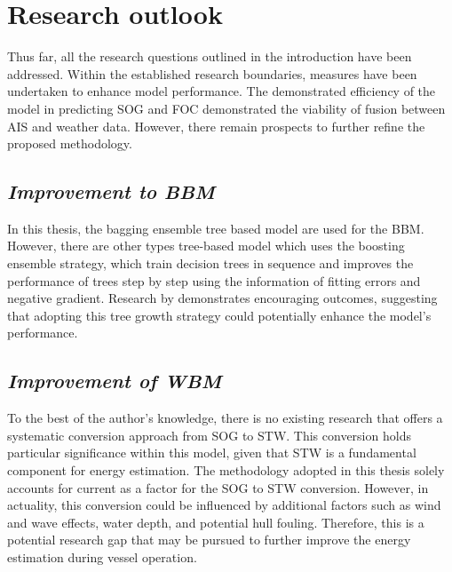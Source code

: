 \pagebreak

\section{Research outlook}\label{sec:research_outlook}

Thus far, all the research questions outlined in the introduction have been addressed. Within the established research boundaries, measures have been undertaken to enhance model performance. The demonstrated efficiency of the model in predicting SOG and FOC demonstrated the viability of fusion between AIS and weather data. However, there remain prospects to further refine the proposed methodology.\\

\subsection*{\emph{Improvement to BBM}}

In this thesis, the bagging ensemble tree based model are used for the BBM. However, there are other types tree-based model which uses the boosting ensemble strategy, which train decision trees in sequence and improves the performance of trees step by step using the information of fitting errors and negative gradient. Research by  demonstrates encouraging outcomes, suggesting that adopting this tree growth strategy could potentially enhance the model's performance.\\


\subsection*{\emph{Improvement of WBM}}

To the best of the author's knowledge, there is no existing research that offers a systematic conversion approach from SOG to STW. This conversion holds particular significance within this model, given that STW is a fundamental component for energy estimation. The methodology adopted in this thesis solely accounts for current as a factor for the SOG to STW conversion. However, in actuality, this conversion could be influenced by additional factors such as wind and wave effects, water depth, and potential hull fouling. Therefore, this is a potential research gap that may be pursued to further improve the energy estimation during vessel operation.\\ 

